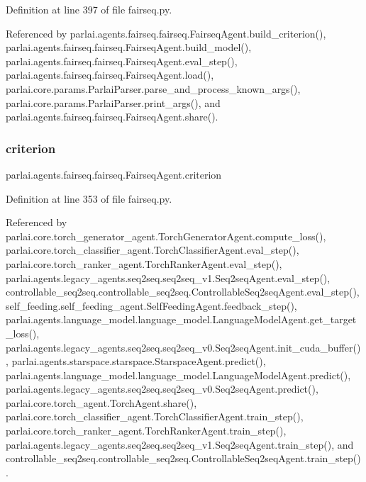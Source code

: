 Definition at line 397 of file fairseq.\+py.



Referenced by parlai.\+agents.\+fairseq.\+fairseq.\+Fairseq\+Agent.\+build\+\_\+criterion(), parlai.\+agents.\+fairseq.\+fairseq.\+Fairseq\+Agent.\+build\+\_\+model(), parlai.\+agents.\+fairseq.\+fairseq.\+Fairseq\+Agent.\+eval\+\_\+step(), parlai.\+agents.\+fairseq.\+fairseq.\+Fairseq\+Agent.\+load(), parlai.\+core.\+params.\+Parlai\+Parser.\+parse\+\_\+and\+\_\+process\+\_\+known\+\_\+args(), parlai.\+core.\+params.\+Parlai\+Parser.\+print\+\_\+args(), and parlai.\+agents.\+fairseq.\+fairseq.\+Fairseq\+Agent.\+share().

\mbox{\label{classparlai_1_1agents_1_1fairseq_1_1fairseq_1_1FairseqAgent_a72d90ad69b45bbffb9da869df770bc40}} 
\subsubsection{\texorpdfstring{criterion}{criterion}}
{\footnotesize\ttfamily parlai.\+agents.\+fairseq.\+fairseq.\+Fairseq\+Agent.\+criterion}



Definition at line 353 of file fairseq.\+py.



Referenced by parlai.\+core.\+torch\+\_\+generator\+\_\+agent.\+Torch\+Generator\+Agent.\+compute\+\_\+loss(), parlai.\+core.\+torch\+\_\+classifier\+\_\+agent.\+Torch\+Classifier\+Agent.\+eval\+\_\+step(), parlai.\+core.\+torch\+\_\+ranker\+\_\+agent.\+Torch\+Ranker\+Agent.\+eval\+\_\+step(), parlai.\+agents.\+legacy\+\_\+agents.\+seq2seq.\+seq2seq\+\_\+v1.\+Seq2seq\+Agent.\+eval\+\_\+step(), controllable\+\_\+seq2seq.\+controllable\+\_\+seq2seq.\+Controllable\+Seq2seq\+Agent.\+eval\+\_\+step(), self\+\_\+feeding.\+self\+\_\+feeding\+\_\+agent.\+Self\+Feeding\+Agent.\+feedback\+\_\+step(), parlai.\+agents.\+language\+\_\+model.\+language\+\_\+model.\+Language\+Model\+Agent.\+get\+\_\+target\+\_\+loss(), parlai.\+agents.\+legacy\+\_\+agents.\+seq2seq.\+seq2seq\+\_\+v0.\+Seq2seq\+Agent.\+init\+\_\+cuda\+\_\+buffer(), parlai.\+agents.\+starspace.\+starspace.\+Starspace\+Agent.\+predict(), parlai.\+agents.\+language\+\_\+model.\+language\+\_\+model.\+Language\+Model\+Agent.\+predict(), parlai.\+agents.\+legacy\+\_\+agents.\+seq2seq.\+seq2seq\+\_\+v0.\+Seq2seq\+Agent.\+predict(), parlai.\+core.\+torch\+\_\+agent.\+Torch\+Agent.\+share(), parlai.\+core.\+torch\+\_\+classifier\+\_\+agent.\+Torch\+Classifier\+Agent.\+train\+\_\+step(), parlai.\+core.\+torch\+\_\+ranker\+\_\+agent.\+Torch\+Ranker\+Agent.\+train\+\_\+step(), parlai.\+agents.\+legacy\+\_\+agents.\+seq2seq.\+seq2seq\+\_\+v1.\+Seq2seq\+Agent.\+train\+\_\+step(), and controllable\+\_\+seq2seq.\+controllable\+\_\+seq2seq.\+Controllable\+Seq2seq\+Agent.\+train\+\_\+step().

